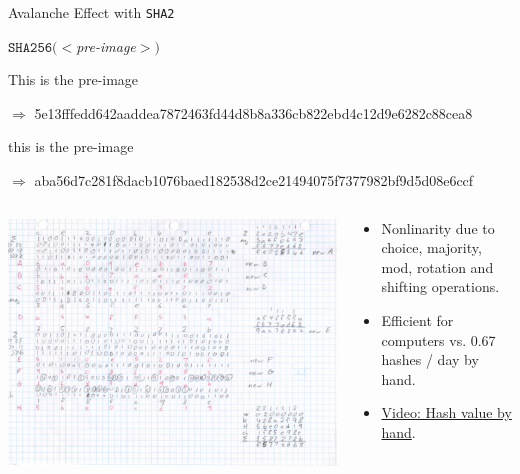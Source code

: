 \documentclass[]{beamer}
\begin{document}
\begin{frame}{Avalanche Effect with \texttt{SHA2}}

\begin{center}
$\texttt{SHA256}(<$\textit{pre-image}$>)$
\end{center}

This is the pre-image

$\Rightarrow$ \footnotesize 5e13fffedd642aaddea7872463fd44d8b8a336cb822ebd4c12d9e6282c88cea8 \normalsize
\vspace{1em}

\color{focus}t\color{black}his is the pre-image

$\Rightarrow$ \footnotesize \color{focus}aba56d7c281f8d\color{black}a\color{focus}cb1076baed182538d2ce21494075f7377982bf9d5d0\color{black}8\color{focus}e6ccf\color{black} \normalsize
\vspace{1em}

\begin{columns}[T]
	\begin{column}{0.35\textwidth}
		\includegraphics[width = 4 cm, frame]{../assets/images/manual_hashing_video.png}
	\end{column} %
	\begin{column}{0.65\textwidth}
		\begin{itemize}
			\item Nonlinarity due to choice, majority, mod, rotation and shifting operations.
			\item Efficient for computers vs. 0.67 hashes / day by hand.
			\item \link \href{https://www.youtube.com/watch?v=y3dqhixzGVo}{Video: Hash value by hand}.
		\end{itemize}
	\end{column}
\end{columns}

	
\end{frame}
\end{document}

